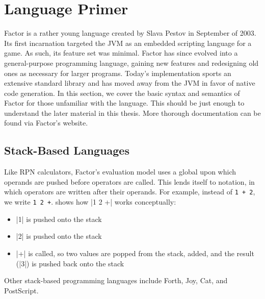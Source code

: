 \section{Language Primer}\label{sec:primer}


Factor is a rather young language created by Slava Pestov in September of 2003.
Its first incarnation targeted the \gls{JVM} as an embedded scripting language
for a game.  As such, its feature set was minimal.  Factor has since evolved
into a general-purpose programming language, gaining new features and
redesigning old ones as necessary for larger programs.  Today's implementation
sports an extensive standard library and has moved away from the \gls{JVM} in
favor of native code generation.  In this section, we cover the basic syntax and semantics of Factor for those
unfamiliar with the language.  This should be just enough to understand the
later material in this thesis.  More thorough documentation
can be found via Factor's website.

\subsection{Stack-Based Languages}\label{sec:primer:stack-based}


Like \gls{RPN} calculators, Factor's evaluation model uses a global
 upon which operands are pushed before operators are called.  This
lends itself to  notation, in which operators are written after
their operands.  For example, instead of \texttt{1~+~2}, we write
\texttt{1~2~+}.   shows how \factor|1 2 +| works conceptually:
\begin{itemize}
  \item \factor|1| is pushed onto the stack
  \item \factor|2| is pushed onto the stack
  \item \factor|+| is called, so two values are popped from the stack, added,
        and the result (\factor|3|) is pushed back onto the stack
\end{itemize}
Other stack-based programming languages include Forth,
Joy, Cat, and PostScript.

